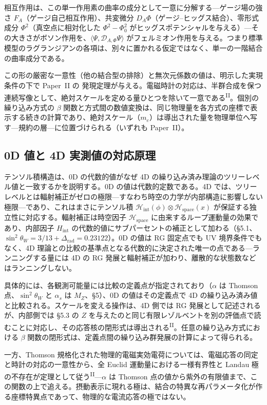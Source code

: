 \documentclass[fontsize=11pt,paper=a4,lualatex]{jlreq}
\newcommand{\PII}{\textsuperscript{\textup{II}}}
\begin{document}
相互作用は、この単一作用素の曲率の成分として一意に分解する---ゲージ場の強さ $F_A$（ゲージ自己相互作用）、共変微分 $D_A\Phi$（ゲージ--ヒッグス結合）、零形式成分 $\Phi^2$（真空点に相対化した $\Phi^2 - \Phi_0^2$ がヒッグスポテンシャルを与える）---その大きさがボソン作用を、$\langle\Psi, \mathcal{D}_{A,\Phi}\Psi\rangle$ がフェルミオン作用を与える。つまり標準模型のラグランジアンの各項は、別々に置かれる仮定ではなく、単一の一階結合の曲率成分である。

この形の厳密な一意性（他の結合型の排除）と無次元係数の値は、明示した実現条件の下で Paper~II の 発現定理が与える。電磁時計の対応は、半群合成を保つ連続写像として、絶対スケールを定める量ひとつを除いて一意である\PII{}。個別の繰り込み方式の $\beta$ 関数と方式間の数値変換は、同じ物理量を各方式の座標で表示する続きの計算であり、絶対スケール（$m_e$）は導出された量を物理単位へ写す---規約の層---に位置づけられる（いずれも Paper~II）。

\subsection{0D 値と 4D 実測値の対応原理}\label{sec:correspondence}

テンソル積構造は、0D の代数的値がなぜ 4D の繰り込み済み理論のツリーレベル値と一致するかを説明する。0D の値は代数的定数である。4D では、ツリーレベルとは輻射補正がゼロの極限---すなわち時空の力学が内部構造に影響しない極限---であり、これはまさにテンソル積 $\mathcal{H}_\mathrm{int}(\phi) \otimes \mathcal{H}_\mathrm{space}(x)$ が保証する独立性に対応する。輻射補正は時空因子 $\mathcal{H}_\mathrm{space}$ に由来するループ運動量の効果であり、内部因子 $H_\mathrm{int}$ の代数的値にサブパーセントの補正として加わる（§5.1、$\sin^2\theta_W = 3/13 + \Delta_\mathrm{rad} = 0.23122$）。0D の値は RG 固定点でも UV 境界条件でもなく、4D 理論との比較の基準点となる代数的に決定された唯一の点である---ランニングする量には 4D の RG 発展と輻射補正が加わり、離散的な状態数などはランニングしない。

具体的には、各観測可能量には比較の定義点が指定されており（$\alpha$ は Thomson 点、$\sin^2\!\theta_W$ と $\alpha_s$ は $M_Z$、§5）、0D の値はその定義点で 4D の繰り込み済み値と比較される。スケールを変える操作は、4D 側では RG 発展として記述されるが、内部側では §5.3 の $Z$ を与えたのと同じ有限レゾルベントを別の評価点で読むことに対応し、その応答核の閉形式は導出される\PII{}。任意の繰り込み方式における $\beta$ 関数の閉形式は、定義点間の繰り込み群発展の計算によって得られる。

一方、Thomson 規格化された物理的電磁実効電荷については、電磁応答の同定と時計の対応の一意性から、全 Euclid 運動量における一様有界性と Landau 極の不存在が定理として従う\PII{}---$\alpha$ は Thomson 点の値から紫外の有限値まで、この関数の上で追える。摂動表示に現れる極は、結合の特異な再パラメータ化が作る座標特異点であって、物理的な電流応答の極ではない。
\end{document}
